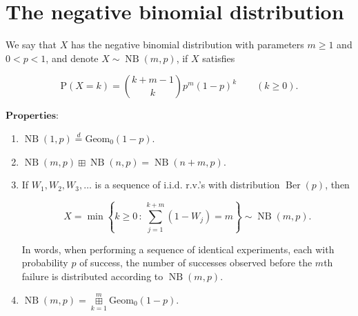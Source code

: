 \section{The negative binomial distribution}

We say that $X$ has the negative binomial
distribution with parameters $m\ge1$ and $0<p<1$, and
denote $X\sim \operatorname{NB}(m,p)$, if $X$
satisfies

\[
\mathrm{P}(X=k) = \binom{k+m-1}{k} p^m (1-p)^k \qquad (k\ge 0).
\]

\noindent $\textbf{Properties:}$

\begin{enumerate}[label=\arabic*.]
\item $\operatorname{NB}(1,p) \stackrel{d}{=}
\operatorname{Geom_0}(1-p)$.

\item $\operatorname{NB}(m,p) \boxplus
\operatorname{NB}(n,p) = \operatorname{NB}(n+m,p)$.

\item If $W_1,W_2,W_3, \ldots$ is a sequence of i.i.d.
r.v.'s with distribution $\operatorname{Ber}(p)$,
then

\[
X = \min\left\{ k\ge 0\,:\, \sum_{j=1}^{k+m} (1-W_j) = m\right\}  \sim \operatorname{NB}(m,p).
\]

\noindent In words, when performing a sequence of identical
experiments, each with probability $p$ of success,
the number of successes observed before the $m$th
failure is distributed according to
$\operatorname{NB}(m,p)$.

\item $\operatorname{NB}(m,p) =
\mathop{\boxplus}\limits_{k=1}^m
\operatorname{Geom_0}(1-p)$.
\end{enumerate}
